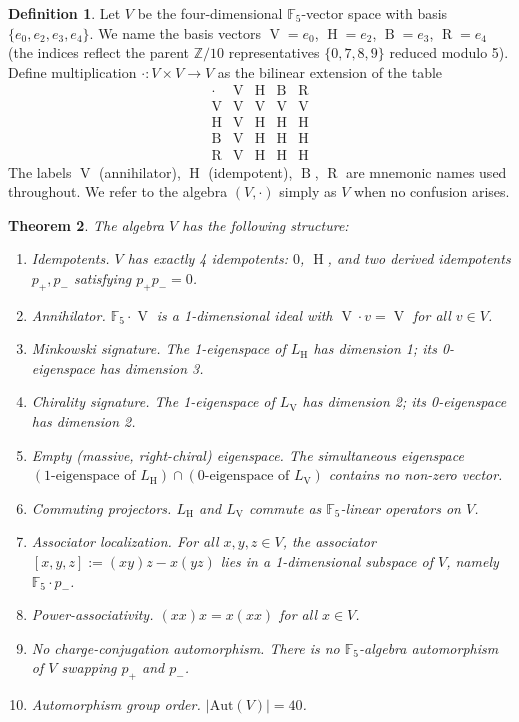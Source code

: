 \documentclass[11pt,reqno]{amsart}
\theoremstyle{plain}
\newtheorem{theorem}{Theorem}[section]
\theoremstyle{definition}
\newtheorem{definition}[theorem]{Definition}
\theoremstyle{remark}
\newcommand{\Z}{\mathbb{Z}}
\newcommand{\F}{\mathbb{F}}
\newcommand{\Aut}{\mathrm{Aut}}
\DeclareMathOperator{\HARM}{H}
\DeclareMathOperator{\VOID}{V}
\DeclareMathOperator{\BREATH}{B}
\DeclareMathOperator{\RESET}{R}
\begin{document}
\begin{definition}\label{def:V}
Let $V$ be the four-dimensional $\F_5$-vector space with basis
$\{e_0, e_2, e_3, e_4\}$. We name the basis vectors
$\VOID = e_0$, $\HARM = e_2$, $\BREATH = e_3$, $\RESET = e_4$ (the
indices reflect the parent $\Z/10$ representatives $\{0,7,8,9\}$
reduced modulo 5). Define multiplication $\cdot: V \times V \to V$ as
the bilinear extension of the table
\begin{equation}\label{eq:CL-table}
\begin{array}{c|cccc}
\cdot & \VOID & \HARM & \BREATH & \RESET \\ \hline
\VOID & \VOID & \VOID & \VOID & \VOID \\
\HARM & \VOID & \HARM & \HARM & \HARM \\
\BREATH & \VOID & \HARM & \HARM & \HARM \\
\RESET & \VOID & \HARM & \HARM & \HARM
\end{array}
\end{equation}
The labels $\VOID$ (annihilator), $\HARM$ (idempotent), $\BREATH$,
$\RESET$ are mnemonic names used throughout. We refer to the algebra
$(V, \cdot)$ simply as $V$ when no confusion arises.
\end{definition}

\begin{theorem}\label{thm:dirac}
The algebra $V$ has the following structure:
\begin{enumerate}
\item \emph{Idempotents.} $V$ has exactly 4 idempotents: $0$, $\HARM$, and
two derived idempotents $p_+, p_-$ satisfying $p_+ p_- = 0$.
\item \emph{Annihilator.} $\F_5 \cdot \VOID$ is a 1-dimensional ideal
with $\VOID \cdot v = \VOID$ for all $v \in V$.
\item \emph{Minkowski signature.} The 1-eigenspace of $L_{\HARM}$ has
dimension 1; its 0-eigenspace has dimension 3.
\item \emph{Chirality signature.} The 1-eigenspace of $L_{\VOID}$ has
dimension 2; its 0-eigenspace has dimension 2.
\item \emph{Empty (massive, right-chiral) eigenspace.} The simultaneous
eigenspace $(\text{1-eigenspace of } L_{\HARM}) \cap
(\text{0-eigenspace of } L_{\VOID})$ contains no non-zero vector.
\item \emph{Commuting projectors.} $L_{\HARM}$ and $L_{\VOID}$ commute
as $\F_5$-linear operators on $V$.
\item \emph{Associator localization.} For all $x,y,z \in V$, the
associator $[x,y,z] := (xy)z - x(yz)$ lies in a 1-dimensional subspace
of $V$, namely $\F_5 \cdot p_-$.
\item \emph{Power-associativity.} $(xx)x = x(xx)$ for all $x \in V$.
\item \emph{No charge-conjugation automorphism.} There is no
$\F_5$-algebra automorphism of $V$ swapping $p_+$ and $p_-$.
\item \emph{Automorphism group order.} $|\Aut(V)| = 40$.
\end{enumerate}
\end{theorem}
\end{document}
